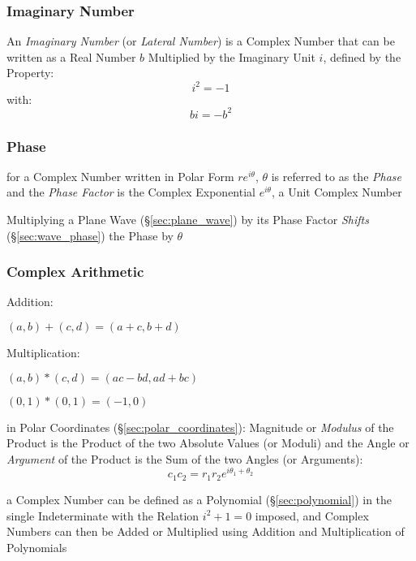 \subsubsection{Imaginary Number}\label{sec:imaginary_number}

An \emph{Imaginary Number} (or \emph{Lateral Number}) is a Complex Number that
can be written as a Real Number $b$ Multiplied by the Imaginary Unit $i$,
defined by the Property:
\[
  i^2 = -1
\]
with:
\[
  bi = -b^2
\]



\subsubsection{Phase}\label{sec:phase}

for a Complex Number written in Polar Form $re^{i\theta}$, $\theta$ is referred
to as the \emph{Phase} and the \emph{Phase Factor} is the Complex Exponential
$e^{i\theta}$, a Unit Complex Number

Multiplying a Plane Wave (\S\ref{sec:plane_wave}) by its Phase Factor
\emph{Shifts} (\S\ref{sec:wave_phase}) the Phase by $\theta$



\subsubsection{Complex Arithmetic}\label{sec:complex_arithmetic}

Addition:

$(a,b) + (c,d) = (a + c, b + d)$

Multiplication:

$(a,b)*(c,d) = (ac - bd, ad + bc)$

$(0,1)*(0,1) = (-1, 0)$

in Polar Coordinates (\S\ref{sec:polar_coordinates}): Magnitude or
\emph{Modulus} of the Product is the Product of the two Absolute
Values (or Moduli) and the Angle or \emph{Argument} of the Product is
the Sum of the two Angles (or Arguments):
\[
  c_1 c_2 = r_1 r_2 e^{i\theta_1 + \theta_2}
\]

a Complex Number can be defined as a Polynomial (\S\ref{sec:polynomial}) in the
single Indeterminate with the Relation $i^2 + 1 = 0$ imposed, and Complex
Numbers can then be Added or Multiplied using Addition and Multiplication of
Polynomials



